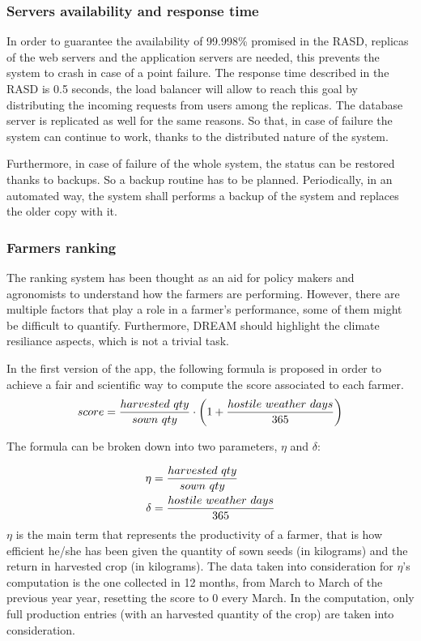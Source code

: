 \documentclass[table, 12pt]{article}
\begin{document}
\subsubsection{Servers availability and response time} 
\label{server_availability}
In order to guarantee the availability of 99.998\% promised in the RASD, replicas of the web servers and the application servers are needed, this prevents the system to crash in case of a point failure.
The response time described in the RASD is 0.5 seconds, the load balancer will allow to reach this goal by distributing the incoming requests from users among the replicas.
The database server is replicated as well for the same reasons.
So that, in case of failure the system can continue to work, thanks to the distributed nature of the system. 

Furthermore, in case of failure of the whole system, the status can be restored thanks to backups. 
So a backup routine has to be planned.
Periodically, in an automated way, the system shall performs a backup of the system and replaces the older copy with it.
\subsubsection{Farmers ranking} 
The ranking system has been thought as an aid for policy makers and agronomists to understand how the farmers are performing. However, there are multiple factors that play a role in a farmer's performance, some of them might be difficult to quantify. Furthermore, DREAM should highlight the climate resiliance aspects, which is not a trivial task.

In the first version of the app, the following formula is proposed in order to achieve a fair and scientific way to compute the score associated to each farmer.
\begin{equation}
    score = {harvested\ qty\over sown\ qty}\cdot \left( 1 + {hostile\ weather\ days\over 365}\right)
\end{equation}

The formula can be broken down into two parameters, $\eta$ and $\delta$:

\begin{align}  
    \eta &= {harvested\ qty\over sown\ qty}\\
    \delta &= {hostile\ weather\ days\over 365}
\end{align}
$\eta$ is the main term that represents the productivity of a farmer, that is how efficient he/she has been given the quantity of sown seeds (in kilograms) and the return in harvested crop (in kilograms). The data taken into consideration for $\eta$'s computation is the one collected in 12 months, from March to March of the previous year year\footnotemark, resetting the score to 0 every March.
In the computation, only full production entries (with an harvested quantity of the crop) are taken into consideration.
\end{document}
